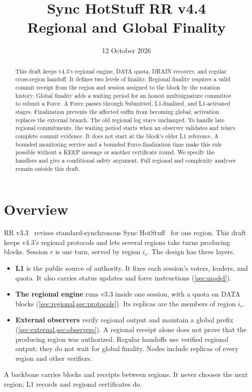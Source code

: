\documentclass[11pt,a4paper]{article}
\title{Sync HotStuff RR v4.4\\\large Regional and Global Finality}
\author{}\date{12 October 2026}
\newcounter{protocol}
\begin{document}
\maketitle
\begin{abstract}
This draft keeps v4.3's regional engine, DATA quota, DRAIN recovery, and
regular cross-region handoff. It defines two levels of finality.
Regional finality requires a valid commit receipt from the region and
session assigned to the block by the rotation history. Global finality
adds a waiting period for an honest multisignature committee to submit
a Force. A Force passes through Submitted, L1-finalized, and L1-activated
stages. Finalization prevents the affected suffix from becoming global;
activation replaces the external branch. The old regional log stays
unchanged. To handle late regional commitments, the waiting period starts
when an observer validates and relays complete commit evidence. It does
not start at the block's older L1 reference. A bounded monitoring service
and a bounded Force-finalization time make this rule possible without a
KEEP message or another certificate round. We specify the handlers and
give a conditional safety argument. Full regional and complexity analyses
remain outside this draft.
\end{abstract}

\section{Overview}
\label{sec:overview}
RR v3.3~\cite{rr33} revises standard-synchronous Sync HotStuff~\cite{sync}
for one region. This draft keeps v4.3's regional protocols and lets several regions
take turns producing blocks. Session $r$ is one turn, served by region $i_r$. The design has
three layers.
\begin{itemize}
\item \textbf{L1} is the public source of authority. It fixes each
session's voters, leaders, and quota. It also carries status updates
and force instructions (\cref{sec:model}).
\item \textbf{The regional engine} runs v3.3 inside one session, with a
quota on DATA blocks (\cref{sec:regional,sec:protocols}). Its replicas
are the members of region $i_r$.
\item \textbf{External observers} verify regional output and maintain a
global prefix (\cref{sec:external,sec:observers}). A regional receipt
alone does not prove that the producing region was authorized. Regular
handoffs use verified regional output; they do not wait for global
finality. Nodes include replicas of every region and other verifiers.
\end{itemize}
A backbone carries blocks and receipts between regions. It never
chooses the next region; L1 records and regional certificates do.
\end{document}
